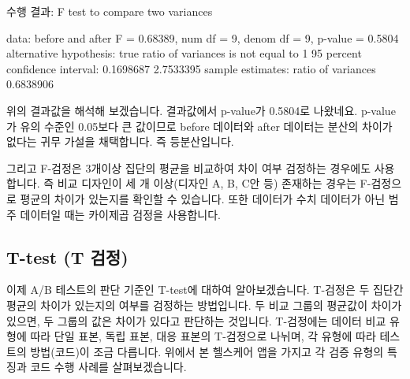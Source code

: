 \documentclass[
  letterpaper,
]{book}
\newenvironment{Shaded}{\begin{snugshade}}{\end{snugshade}}
\newcommand{\DecValTok}[1]{\textcolor[rgb]{0.68,0.00,0.00}{#1}}
\newcommand{\FloatTok}[1]{\textcolor[rgb]{0.68,0.00,0.00}{#1}}
\newcommand{\NormalTok}[1]{\textcolor[rgb]{0.00,0.23,0.31}{#1}}
\newcommand{\OtherTok}[1]{\textcolor[rgb]{0.00,0.23,0.31}{#1}}
\newcommand{\SpecialCharTok}[1]{\textcolor[rgb]{0.37,0.37,0.37}{#1}}
\renewenvironment{Shaded}
    {\begin{snugshade}
    \begin{singlespace}
    \linespread{1}
    }
    {\end{singlespace}
    \end{snugshade}
}
\begin{document}
\begin{Shaded}
\begin{Highlighting}[]
\NormalTok{수행 결과}\SpecialCharTok{:}
\NormalTok{F test to compare two variances}

\NormalTok{data}\SpecialCharTok{:}\NormalTok{  before and after}
\NormalTok{F }\OtherTok{=} \FloatTok{0.68389}\NormalTok{, num df }\OtherTok{=} \DecValTok{9}\NormalTok{, denom df }\OtherTok{=} \DecValTok{9}\NormalTok{, p}\SpecialCharTok{{-}}\NormalTok{value }\OtherTok{=} \FloatTok{0.5804}
\NormalTok{alternative hypothesis}\SpecialCharTok{:}\NormalTok{ true ratio of variances is not equal to }\DecValTok{1}
\DecValTok{95}\NormalTok{ percent confidence interval}\SpecialCharTok{:}
 \FloatTok{0.1698687} \FloatTok{2.7533395}
\NormalTok{sample estimates}\SpecialCharTok{:}
\NormalTok{ratio of variances }
         \FloatTok{0.6838906} 
\end{Highlighting}
\end{Shaded}

위의 결과값을 해석해 보겠습니다. 결과값에서 p-value가 0.5804로 나왔네요.
p-value가 유의 수준인 0.05보다 큰 값이므로 before 데이터와 after
데이터는 분산의 차이가 없다는 귀무 가설을 채택합니다. 즉 등분산입니다.

그리고 F-검정은 3개이상 집단의 평균을 비교하여 차이 여부 검정하는
경우에도 사용합니다. 즉 비교 디자인이 세 개 이상(디자인 A, B, C안 등)
존재하는 경우는 F-검정으로 평균의 차이가 있는지를 확인할 수 있습니다.
또한 데이터가 수치 데이터가 아닌 범주 데이터일 때는 카이제곱 검정을
사용합니다.

\subsection{T-test (T 검정)}\label{t-test-t-uxac80uxc815}

이제 A/B 테스트의 판단 기준인 T-test에 대하여 알아보겠습니다. T-검정은
두 집단간 평균의 차이가 있는지의 여부를 검정하는 방법입니다. 두 비교
그룹의 평균값이 차이가 있으면, 두 그룹의 값은 차이가 있다고 판단하는
것입니다. T-검정에는 데이터 비교 유형에 따라 단일 표본, 독립 표본, 대응
표본의 T-검정으로 나뉘며, 각 유형에 따라 테스트의 방법(코드)이 조금
다릅니다. 위에서 본 헬스케어 앱을 가지고 각 검증 유형의 특징과 코드 수행
사례를 살펴보겠습니다.
\end{document}

